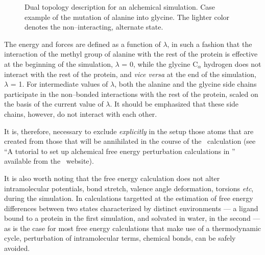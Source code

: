 \begin{figure}[ht]
  \caption{Dual topology description for an alchemical simulation.
         Case example of the mutation of alanine into glycine.
         The lighter color denotes the non--interacting, alternate
         state.}
  \label{fig:dual_top}
\end{figure}


The energy and forces
are defined as a function of $\lambda$, in such a fashion that 
the interaction of the methyl group of alanine with the rest of 
the protein is effective at the beginning of the simulation,
\ie $\lambda$ = 0, while
the glycine C$_\alpha$ hydrogen does not interact with the rest
of the protein, and {\it vice versa} at the end of the
simulation, \ie $\lambda$ = 1.
For intermediate values of $\lambda$, both the alanine and the glycine
side chains participate in the non--bonded interactions with the rest 
of the protein, scaled on the basis of the current value of $\lambda$.
It should be emphasized that these side chains, however,
do not interact with each other.


It is, therefore, necessary to exclude {\it explicitly} in the setup
those atoms 
that are created from those that will be annihilated in the 
course of the \FEP\ calculation (see ``A tutorial to set up 
alchemical free energy perturbation calculations in \NAMD''
available from the \NAMD\ website).


It is also worth noting that
the free energy calculation does not alter intramolecular
potentials, \ie bond stretch, valence angle deformation, torsions
{\it etc}, during the simulation.
In calculations targetted at the estimation
of free energy differences between two states characterized by
distinct environments --- \eg a ligand bound to a protein in
the first simulation,
and solvated in water, in the second --- as is the 
case for most free energy calculations that make use of a thermodynamic 
cycle, perturbation of intramolecular terms, 
\eg chemical bonds, can be safely
avoided.~\cite{Boresch.99a}



